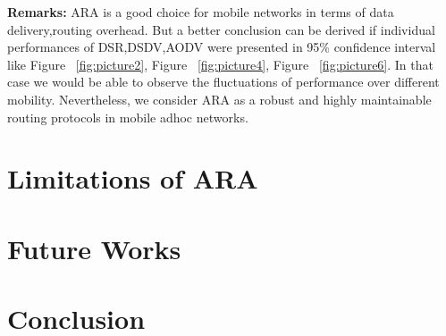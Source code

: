 \textbf{Remarks:} ARA is a good choice for mobile networks in terms of data delivery,routing overhead. But a better conclusion can be derived if individual performances of DSR,DSDV,AODV were presented in 95\% confidence interval like Figure ~\ref{fig:picture2}, Figure ~\ref{fig:picture4}, Figure ~\ref{fig:picture6}. In that case we would be able to observe the fluctuations of performance over different mobility. 
Nevertheless, we consider ARA as a robust and highly maintainable routing protocols in mobile adhoc networks. 

\section{Limitations of ARA}


\section{Future Works}

\section{Conclusion}

